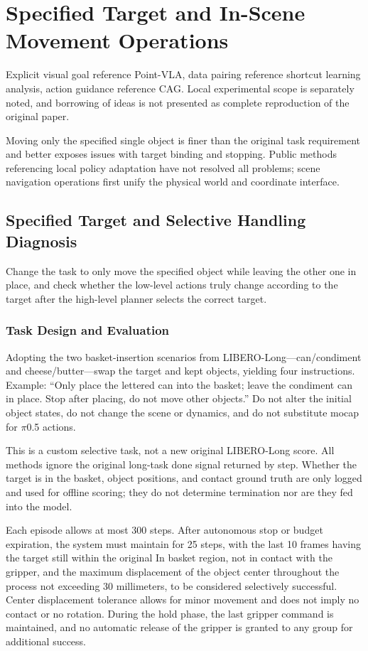 \chapter{Specified Target and In-Scene Movement Operations}
Explicit visual goal reference Point-VLA\cite{pointvla}, data pairing reference shortcut learning analysis\cite{shortcut}, action guidance reference CAG\cite{cag}. Local experimental scope is separately noted, and borrowing of ideas is not presented as complete reproduction of the original paper.


Moving only the specified single object is finer than the original task requirement and better exposes issues with target binding and stopping. Public methods referencing local policy adaptation have not resolved all problems; scene navigation operations first unify the physical world and coordinate interface.

\section{Specified Target and Selective Handling Diagnosis}

\label{stage:s13}

Change the task to only move the specified object while leaving the other one in place, and check whether the low-level actions truly change according to the target after the high-level planner selects the correct target.

\subsection{Task Design and Evaluation}\label{s13-detail-1}

Adopting the two basket-insertion scenarios from LIBERO-Long—can/condiment and cheese/butter—swap the target and kept objects, yielding four instructions. Example: ``Only place the lettered can into the basket; leave the condiment can in place. Stop after placing, do not move other objects.'' Do not alter the initial object states, do not change the scene or dynamics, and do not substitute mocap for \(\pi\)0.5 actions.

This is a custom selective task, not a new original LIBERO-Long score. All methods ignore the original long-task done signal returned by step. Whether the target is in the basket, object positions, and contact ground truth are only logged and used for offline scoring; they do not determine termination nor are they fed into the model.

Each episode allows at most 300 steps. After autonomous stop or budget expiration, the system must maintain for 25 steps, with the last 10 frames having the target still within the original In basket region, not in contact with the gripper, and the maximum displacement of the object center throughout the process not exceeding 30 millimeters, to be considered selectively successful. Center displacement tolerance allows for minor movement and does not imply no contact or no rotation. During the hold phase, the last gripper command is maintained, and no automatic release of the gripper is granted to any group for additional success.

